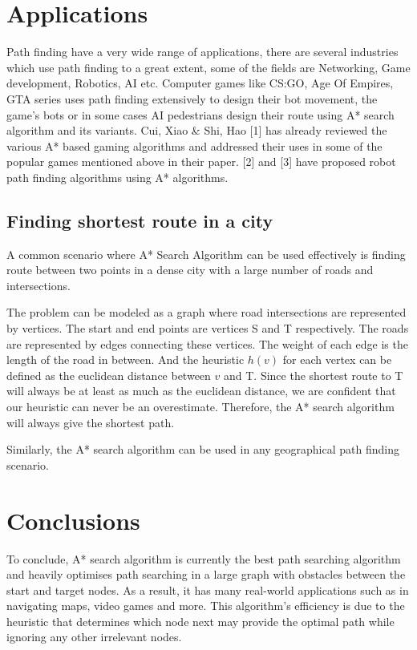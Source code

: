 \documentclass{article}
\theoremstyle{definition}
\begin{document}
\section{Applications}
Path finding have a very wide range of applications, there are several industries which use path finding to a great extent, some of the fields are Networking, Game development, Robotics, AI etc.
 Computer games like CS:GO, Age Of Empires, GTA series uses path finding extensively to design their bot movement, the game's bots or in some cases AI pedestrians design their route using A* search algorithm and its variants. Cui, Xiao \& Shi, Hao [1] has already reviewed the various A* based gaming algorithms and addressed their uses in some of the popular games mentioned above in their paper. [2] and [3] have proposed robot path finding algorithms using A* algorithms. 
\subsection{Finding shortest route in a city}

A common scenario where A* Search Algorithm can be used effectively is finding route between two points in a dense city with a large number of roads and intersections.

The problem can be modeled as a graph where road intersections are represented by vertices. The start and end points are vertices S and T respectively. The roads are represented by edges connecting these vertices. The weight of each edge is the length of the road in between. And the heuristic $h(v)$ for each vertex can be defined as the euclidean distance between $v$ and T. Since the shortest route to T will always be at least as much as the euclidean distance, we are confident that our heuristic can never be an overestimate. Therefore, the A* search algorithm will always give the shortest path.

Similarly, the A* search algorithm can be used in any geographical path finding scenario.

\section{Conclusions}

To conclude, A* search algorithm is currently the best path searching algorithm and heavily optimises path searching in a large graph with obstacles between the start and target nodes. As a result, it has many real-world applications such as in navigating maps, video games and more. This algorithm's efficiency is due to the heuristic that determines which node next may provide the optimal path while ignoring any other irrelevant nodes.
\end{document}
